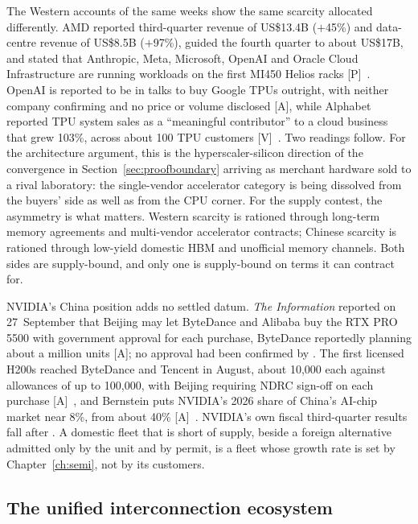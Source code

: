 The Western accounts of the same weeks show the same scarcity allocated differently. AMD reported third-quarter revenue of US\$13.4B ($+$45\%) and data-centre revenue of US\$8.5B ($+$97\%), guided the fourth quarter to about US\$17B, and stated that Anthropic, Meta, Microsoft, OpenAI and Oracle Cloud Infrastructure are running workloads on the first MI450 Helios racks [P]~\cite{hw-amd-q3}. OpenAI is reported to be in talks to buy Google TPUs outright, with neither company confirming and no price or volume disclosed [A], while Alphabet reported TPU system sales as a ``meaningful contributor'' to a cloud business that grew 103\%, across about 100 TPU customers [V]~\cite{hw-openai-tpu}. Two readings follow. For the architecture argument, this is the hyperscaler-silicon direction of the convergence in Section~\ref{sec:proofboundary} arriving as merchant hardware sold to a rival laboratory: the single-vendor accelerator category is being dissolved from the buyers' side as well as from the CPU corner. For the supply contest, the asymmetry is what matters. Western scarcity is rationed through long-term memory agreements and multi-vendor accelerator contracts; Chinese scarcity is rationed through low-yield domestic HBM and unofficial memory channels. Both sides are supply-bound, and only one is supply-bound on terms it can contract for.

NVIDIA's China position adds no settled datum. \emph{The Information} reported on 27~September that Beijing may let ByteDance and Alibaba buy the RTX PRO 5500 with government approval for each purchase, ByteDance reportedly planning about a million units [A]; no approval had been confirmed by \datafreeze. The first licensed H200s reached ByteDance and Tencent in August, about 10{,}000 each against allowances of up to 100{,}000, with Beijing requiring NDRC sign-off on each purchase [A]~\cite{hw-nvidia-china}, and Bernstein puts NVIDIA's 2026 share of China's AI-chip market near 8\%, from about 40\% [A]~\cite{hw-huawei-connect-2026}. NVIDIA's own fiscal third-quarter results fall after \datafreeze. A domestic fleet that is short of supply, beside a foreign alternative admitted only by the unit and by permit, is a fleet whose growth rate is set by Chapter~\ref{ch:semi}, not by its customers.

\subsection{The unified interconnection ecosystem}

